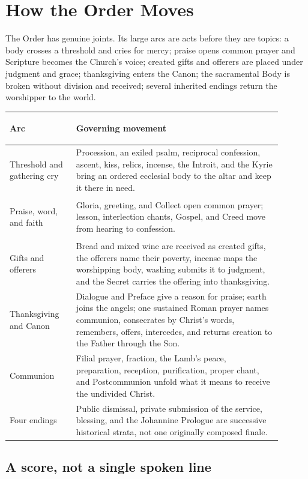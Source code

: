 \section{How the Order Moves}

The Order has genuine joints. Its large arcs are acts before they are topics: a body crosses a threshold and cries for mercy; praise opens common prayer and Scripture becomes the Church's voice; created gifts and offerers are placed under judgment and grace; thanksgiving enters the Canon; the sacramental Body is broken without division and received; several inherited endings return the worshipper to the world.

\begin{longtable}{>{\bfseries\raggedright\arraybackslash}p{0.22\linewidth}>{\raggedright\arraybackslash}p{0.68\linewidth}}
\toprule
Arc & Governing movement\\
\midrule
\endhead
Threshold and gathering cry & Procession, an exiled psalm, reciprocal confession, ascent, kiss, relics, incense, the Introit, and the Kyrie bring an ordered ecclesial body to the altar and keep it there in need.\\
Praise, word, and faith & Gloria, greeting, and Collect open common prayer; lesson, interlection chants, Gospel, and Creed move from hearing to confession.\\
Gifts and offerers & Bread and mixed wine are received as created gifts, the offerers name their poverty, incense maps the worshipping body, washing submits it to judgment, and the Secret carries the offering into thanksgiving.\\
Thanksgiving and Canon & Dialogue and Preface give a reason for praise; earth joins the angels; one sustained Roman prayer names communion, consecrates by Christ's words, remembers, offers, intercedes, and returns creation to the Father through the Son.\\
Communion & Filial prayer, fraction, the Lamb's peace, preparation, reception, purification, proper chant, and Postcommunion unfold what it means to receive the undivided Christ.\\
Four endings & Public dismissal, private submission of the service, blessing, and the Johannine Prologue are successive historical strata, not one originally composed finale.\\
\bottomrule
\end{longtable}

\subsection{A score, not a single spoken line}

